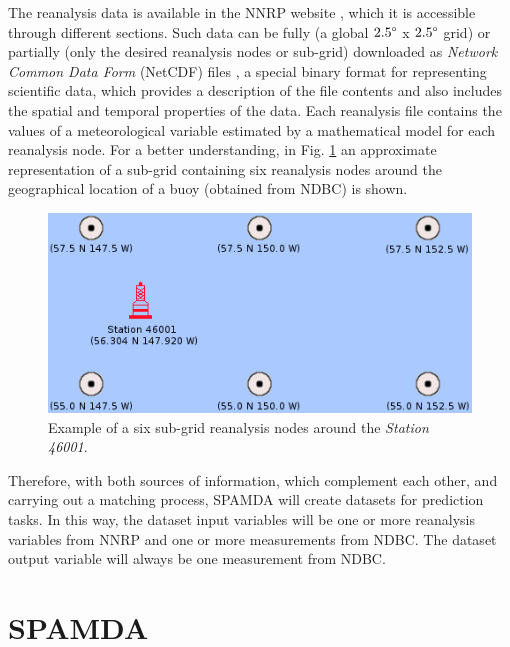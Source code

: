 \documentclass[energies,article,submit,moreauthors,pdftex]{Definitions/mdpi}
\begin{document}
\begin{itemize}
			The reanalysis data is available in the NNRP website \cite{NNRP}, which it is accessible through different sections. Such data can be fully (a global $2.5\degree$ x $2.5\degree$ grid) or partially (only the desired reanalysis nodes or sub-grid) downloaded as \textit{Network Common Data Form} (NetCDF) files \cite{NetCDF}, a special binary format for representing scientific data, which provides a description of the file contents and also includes the spatial and temporal properties of the data. Each reanalysis file contains the values of a meteorological variable estimated by a mathematical model for each reanalysis node. For a better understanding, in Fig. \ref{fig:subGrid} an approximate representation of a sub-grid containing six reanalysis nodes around the geographical location of a buoy (obtained from NDBC) is shown.
			
			
			\begin{figure}[ht!]
				\centering
				\includegraphics[scale=0.52]{figures/FigureSubGrid.jpg}
				\caption{Example of a six sub-grid reanalysis nodes around the \textit{Station 46001}.}
				\label{fig:subGrid}
			\end{figure}
			
		\end{itemize}
		
		
		Therefore, with both sources of information, which complement each other, and carrying out a matching process, SPAMDA will create datasets for prediction tasks. In this way, the dataset input variables will be one or more reanalysis variables from NNRP and one or more measurements from NDBC. The dataset output variable will always be one measurement from NDBC.
		
	\section{SPAMDA}\label{sec:SPAMDA}
		
\end{document}
